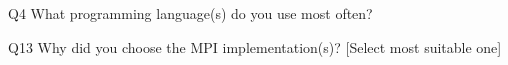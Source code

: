 \begin{description}%
\item{Q4} What programming language(s) do you use most often?%
\item{Q13} Why did you choose the MPI implementation(s)? [Select most suitable one]%
\end{description}%
